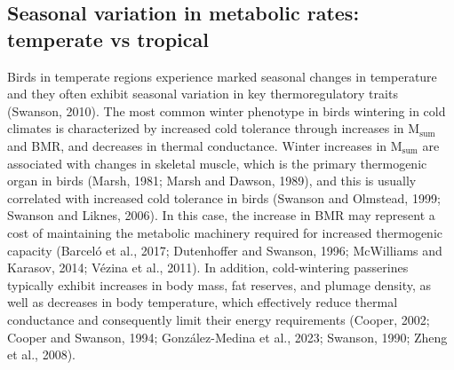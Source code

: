 \documentclass[10pt, twoside]{book} %
\begin{document}
\subsection{Seasonal variation in metabolic rates: temperate vs tropical}

\noindent Birds in temperate regions experience marked seasonal changes in temperature and they often exhibit seasonal variation in key thermoregulatory traits (Swanson, 2010). The most common winter phenotype in birds wintering in cold climates is characterized by increased cold tolerance through increases in M$_{\text{sum}}$ and BMR, and decreases in thermal conductance. Winter increases in M$_{\text{sum}}$ are associated with changes in skeletal muscle, which is the primary thermogenic organ in birds (Marsh, 1981; Marsh and Dawson, 1989), and this is usually correlated with increased cold tolerance in birds (Swanson and Olmstead, 1999; Swanson and Liknes, 2006). In this case, the increase in BMR may represent a cost of maintaining the metabolic machinery required for increased thermogenic capacity (Barceló et al., 2017; Dutenhoffer and Swanson, 1996; McWilliams and Karasov, 2014; Vézina et al., 2011). In addition, cold-wintering passerines typically exhibit increases in body mass, fat reserves, and plumage density, as well as decreases in body temperature, which effectively reduce thermal conductance and consequently limit their energy requirements (Cooper, 2002; Cooper and Swanson, 1994; González-Medina et al., 2023; Swanson, 1990; Zheng et al., 2008).\\
\end{document}
